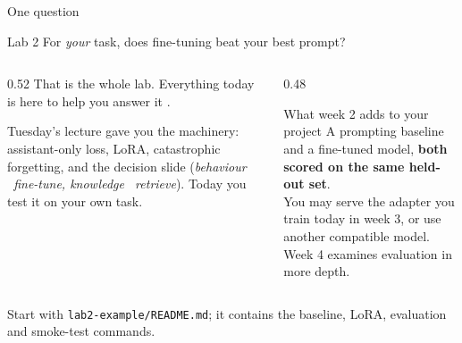 \documentclass[aspectratio=169,10pt]{beamer}
\begin{document}
\begin{frame}{One question}
  \begin{block}{Lab 2}
    \centering\large
    For \emph{your} task, does fine-tuning beat your best prompt?
  \end{block}
  \vspace{0.6em}
  \begin{columns}[T]
    \begin{column}{0.52\textwidth}
      That is the whole lab. Everything today is here to help you answer it
      .
      \vspace{0.5em}

      Tuesday's lecture gave you the machinery: assistant-only loss, LoRA,
      catastrophic forgetting, and the decision slide
      (\emph{behaviour \textrightarrow\ fine-tune, knowledge \textrightarrow\ retrieve}).
      Today you test it on your own task.
    \end{column}
    \begin{column}{0.48\textwidth}
      \begin{block}{What week 2 adds to your project}
        \small
        A prompting baseline and a fine-tuned model, \textbf{both scored on the
        same held-out set}.\\[0.4em]
        You may serve the adapter you train today in week 3, or use another
        compatible model. Week 4 examines evaluation in more depth.
      \end{block}
    \end{column}
  \end{columns}
  \vspace{0.4em}
  \small Start with \texttt{lab2-example/README.md}; it contains the baseline,
  LoRA, evaluation and smoke-test commands.
\end{frame}
\end{document}
